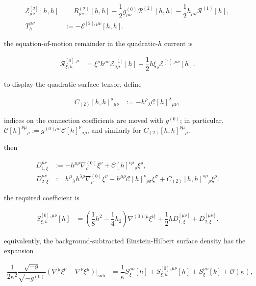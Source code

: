 \begin{align}
\mathcal{E}_{\mu \nu}^{[2]}[h,h] & =R_{\mu \nu}^{(2)}[h,h]-\dfrac{1}{2}g_{\mu \nu}^{(0)}\mathcal{R}^{(2)}[h,h]-\dfrac{1}{2}h_{\mu \nu}\mathcal{R}^{(1)}[h], \\
T_{h}^{\mu \nu} & :=-\mathcal{E}^{[2],\mu \nu}[h,h].
\end{align}

the equation-of-motion remainder in the quadratic-$\displaystyle{h}$ current is

\begin{align}
\mathcal{R}_{\xi,h}^{[0],\mu} & =\xi ^{\rho}h^{\mu \sigma}\mathcal{E}_{\sigma \rho}^{[1]}[h]-\dfrac{1}{2}h\xi _{\nu}\mathcal{E}^{[1],\mu \nu}[h].
\end{align}

to display the quadratic surface tensor, define

\begin{align}
C_{(2)}[h,h]^{\rho}{}_{\mu \nu} & :=-h^{\rho}{}_{\lambda}\mathscr{C}[h]^{\lambda}{}_{\mu \nu},
\end{align}

indices on the connection coefficients are moved with $\displaystyle{g^{(0)}}$; in particular, $\displaystyle{\mathscr{C}[h]^{\nu\mu}{}_{\rho}:=g^{(0)\mu\sigma}\mathscr{C}[h]^{\nu}{}_{\sigma\rho}}$, and similarly for $\displaystyle{C_{(2)}[h,h]^{\nu\mu}{}_{\rho}}$.

then

\[\begin{aligned}
D_{1,\xi}^{\mu \nu} & :=-h^{\mu \rho}\nabla ^{(0)}_{\rho}\xi ^{\nu}+\mathscr{C}[h]^{\nu \mu}{}_{\rho}\xi ^{\rho}, \\
D_{2,\xi}^{\mu \nu} & :=h^{\mu}{}_{\lambda}h^{\lambda \rho}\nabla ^{(0)}_{\rho}\xi ^{\nu}-h^{\mu \rho}\mathscr{C}[h]^{\nu}{}_{\rho \sigma}\xi ^{\sigma}+C_{(2)}[h,h]^{\nu \mu}{}_{\rho}\xi ^{\rho}.
\end{aligned}\]

the required coefficient is

\begin{align}
S_{\xi,h}^{[0],\mu \nu}[h] & =\left(\dfrac{1}{8}h^{2}-\dfrac{1}{4}h_{2}\right)\nabla ^{(0)[\mu}\xi ^{\nu]}+\dfrac{1}{2}hD_{1,\xi}^{[\mu \nu]}+D_{2,\xi}^{[\mu \nu]}.
\end{align}

equivalently, the background-subtracted Einstein-Hilbert surface density has the expansion

\begin{align}
\dfrac{1}{2\kappa ^2}\dfrac{\sqrt{-g}}{\sqrt{-g^{(0)}}}\left(\nabla ^{\mu}\xi ^{\nu}-\nabla ^{\nu}\xi ^{\mu}\right)\bigg|_{\mathrm{sub}} & =\dfrac{1}{\kappa}S_{\xi}^{\mu \nu}[h]+S_{\xi,h}^{[0],\mu \nu}[h]+S_{\xi}^{\mu \nu}[k]+\mathcal{O}(\kappa),
\end{align}

